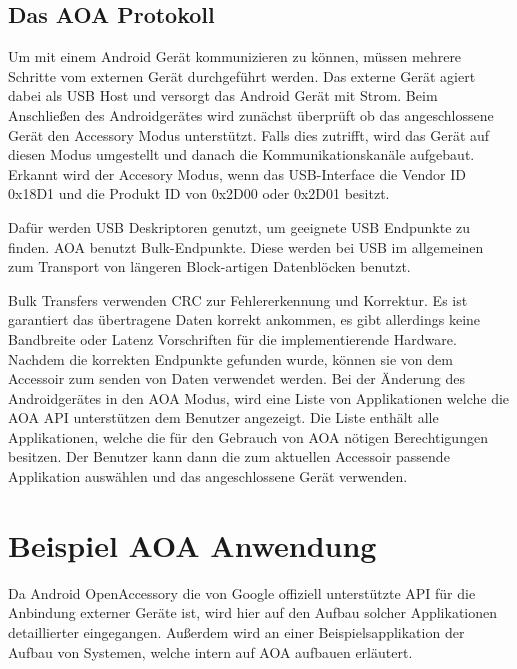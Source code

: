 \documentclass[12pt,journal,compsoc]{IEEEtran}
\begin{document}
\subsection{Das AOA Protokoll}
Um mit einem Android Gerät kommunizieren zu können, müssen mehrere Schritte vom externen Gerät durchgeführt werden.
Das externe Gerät agiert dabei als USB Host und versorgt das Android Gerät mit Strom.
Beim Anschließen des Androidgerätes wird zunächst überprüft ob das angeschlossene Gerät den Accessory Modus unterstützt.
Falls dies zutrifft, wird das Gerät auf diesen Modus umgestellt und danach die Kommunikationskanäle aufgebaut.
Erkannt wird der Accesory Modus, wenn das USB-Interface die Vendor ID 0x18D1 und die Produkt ID von 0x2D00 oder 0x2D01 besitzt. 

Dafür werden USB Deskriptoren genutzt, um geeignete USB Endpunkte zu finden. AOA benutzt Bulk-Endpunkte. Diese werden bei USB im allgemeinen zum Transport von längeren Block-artigen Datenblöcken benutzt.

Bulk Transfers verwenden CRC zur Fehlererkennung und Korrektur. Es ist garantiert das übertragene Daten korrekt ankommen, es gibt allerdings keine Bandbreite oder Latenz Vorschriften für die implementierende Hardware.
\cite{usbbulk}
Nachdem die korrekten Endpunkte gefunden wurde, können sie von dem Accessoir zum senden von Daten verwendet werden.
Bei der Änderung des Androidgerätes in den AOA Modus, wird eine Liste von Applikationen welche die AOA API unterstützen dem Benutzer angezeigt. 
Die Liste enthält alle Applikationen, welche die für den Gebrauch von AOA nötigen Berechtigungen besitzen.
Der Benutzer kann dann die zum aktuellen Accessoir passende Applikation auswählen und das angeschlossene Gerät verwenden.
\begin{figure}[h]
\centering
\def\svgwidth{\columnwidth}

\end{figure}


\section{Beispiel AOA Anwendung}
Da Android OpenAccessory die von Google offiziell unterstützte API für die Anbindung externer Geräte ist, wird hier auf den Aufbau solcher Applikationen detaillierter eingegangen. Außerdem wird an einer Beispielsapplikation der Aufbau von Systemen, welche intern auf AOA aufbauen erläutert.
\end{document}

